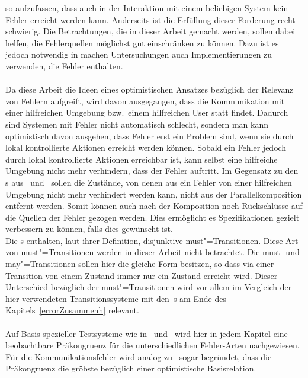 so aufzufassen, dass auch in der Interaktion mit einem beliebigen System kein
Fehler erreicht werden kann. Anderseits ist die Erfüllung dieser Forderung
recht schwierig. Die Betrachtungen, die in dieser Arbeit gemacht werden, sollen
dabei helfen, die Fehlerquellen möglichst gut einschränken zu können. Dazu ist
es jedoch notwendig in machen Untersuchungen auch Implementierungen zu
verwenden, die Fehler enthalten.\\
\\
Da diese Arbeit die Ideen eines optimistischen Ansatzes bezüglich der Relevanz
von Fehlern aufgreift, wird davon ausgegangen, dass die Kommunikation
mit einer hilfreichen Umgebung bzw.\ einem hilfreichen User statt findet.
Dadurch sind Systemen mit Fehler nicht automatisch schlecht, sondern man kann
optimistisch davon ausgehen, dass Fehler erst ein Problem sind, wenn sie durch
lokal kontrollierte Aktionen erreicht werden können. Sobald ein Fehler jedoch
durch lokal kontrollierte Aktionen erreichbar ist, kann
selbst eine hilfreiche Umgebung nicht mehr verhindern, dass der Fehler
auftritt. Im Gegensatz zu den \MIA{}s aus~\cite{Luttgen2013MIA1}
und~\cite{Vogler2016MIA3} sollen die Zustände, von denen aus ein Fehler von
einer hilfreichen Umgebung nicht mehr verhindert werden kann, nicht aus der
Parallelkomposition entfernt werden. Somit können auch nach der Komposition
noch Rückschlüsse auf die Quellen der Fehler gezogen werden. Dies ermöglicht
es Spezifikationen gezielt verbessern zu können, falls dies gewünscht ist.\\
Die \MIA{}s enthalten, laut ihrer Definition, disjunktive must"=Transitionen.
Diese Art von must"=Transitionen werden in dieser Arbeit nicht betrachtet. Die
must- und may"=Transitionen sollen hier die gleiche Form besitzen, so dass via
einer Transition von einem Zustand immer nur ein Zustand erreicht wird. Dieser
Unterschied bezüglich der must"=Transitionen wird vor allem im Vergleich der
hier verwendeten Transitionssysteme mit den~\MIA{}s am Ende des
Kapitels~\ref{errorZusammenh} relevant.\\
\\
Auf Basis spezieller Testsysteme wie in~\cite{Vogler2015FailSem}
und~\cite{Vogler2017dMTS} wird hier in jedem Kapitel eine beobachtbare
Präkongruenz für die unterschiedlichen Fehler-Arten nachgewiesen. Für die
Kommunikationsfehler wird analog zu~\cite{Schinko2016BA} sogar begründet, dass
die Präkongruenz die gröbste bezüglich einer optimistische Basisrelation.\\

